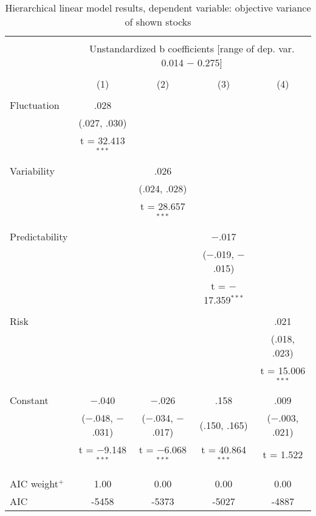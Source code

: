 
\begin{table}[!htbp] \centering 
  \caption{Hierarchical linear model results, dependent variable: objective variance of shown stocks} 
  \label{tab:study1_lm_results} 
\begin{tabular}{@{\extracolsep{5pt}}lcccc} 
\\[-1.8ex]\hline 
\hline \\[-1.8ex] 
 & \multicolumn{4}{c}{Unstandardized b coefficients [range of dep. var. 0.014 $-$ 0.275]} \\ 
\cline{2-5} 
\\[-1.8ex] & (1) & (2) & (3) & (4)\\ 
\hline \\[-1.8ex] 
 Fluctuation & .028 &  &  &  \\ 
  & (.027, .030) &  &  &  \\ 
  & t = 32.413$^{***}$ &  &  &  \\ 
  & & & & \\ 
 Variability &  & .026 &  &  \\ 
  &  & (.024, .028) &  &  \\ 
  &  & t = 28.657$^{***}$ &  &  \\ 
  & & & & \\ 
 Predictability &  &  & $-$.017 &  \\ 
  &  &  & ($-$.019, $-$.015) &  \\ 
  &  &  & t = $-$17.359$^{***}$ &  \\ 
  & & & & \\ 
 Risk &  &  &  & .021 \\ 
  &  &  &  & (.018, .023) \\ 
  &  &  &  & t = 15.006$^{***}$ \\ 
  & & & & \\ 
 Constant & $-$.040 & $-$.026 & .158 & .009 \\ 
  & ($-$.048, $-$.031) & ($-$.034, $-$.017) & (.150, .165) & ($-$.003, .021) \\ 
  & t = $-$9.148$^{***}$ & t = $-$6.068$^{***}$ & t = 40.864$^{***}$ & t = 1.522 \\ 
  & & & & \\ 
\hline \\[-1.8ex] 
AIC weight$^{+}$ & 1.00 & 0.00 & 0.00 & 0.00 \\ 
AIC & -5458 & -5373 & -5027 & -4887 \\ 

\end{tabular}
\end{table}
